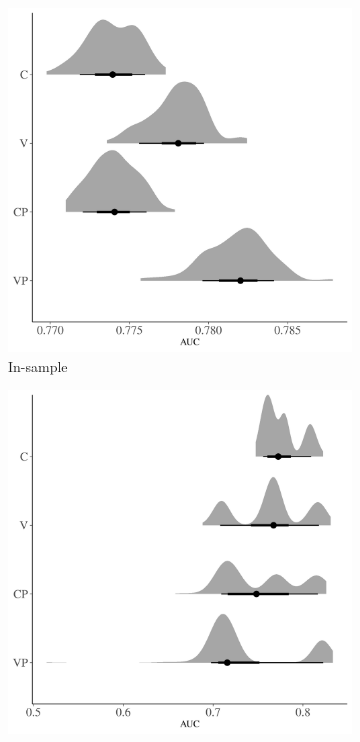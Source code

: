 \documentclass[12pt,letterpaper]{article}
\begin{document}
\begin{refsection}
\begin{figure}[ht]
  \begin{subfigure}[ht]{0.45\textwidth}
    \includegraphics[width=\textwidth,height=0.5\textheight,keepaspectratio=true]{../results/figure/auc_hist_full}
    \caption{In-sample}
    \label{fig:auc_hist}
  \end{subfigure}
  \begin{subfigure}[ht]{0.45\textwidth}
    \includegraphics[width=\textwidth,height=0.5\textheight,keepaspectratio=true]{../results/figure/fold_auc_full}

\end{subfigure}
\end{figure}
\end{refsection}
\end{document}
